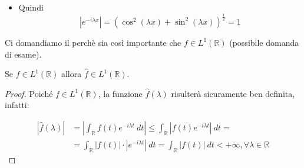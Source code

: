 \begin{itemize}
\begin{center}
          \end{center}
    \item Quindi
          $$
              |e^{-i \lambda x}| = (\cos^2 (\lambda x) + \sin^2(\lambda x))^{\frac{1}{2}} = 1
          $$

\end{itemize}

Ci domandiamo il perchè sia così importante che $f \in L^1(\mathbb{R})$ (possibile domanda di esame).\\

\begin{center}
    Se $f \in L^1(\mathbb{R})$ allora $\hat{f} \in L^1(\mathbb{R})$.
\end{center}

\begin{proof}
    Poiché $f \in L^1(\mathbb{R})$, la funzione $\hat{f}(\lambda)$ risulterà sicuramente ben definita, infatti:

    \begin{equation}
        \begin{aligned}
            |\hat{f}(\lambda)| & = \left|\int_{\mathbb{R}} f(t) e^{-i \lambda t} \ dt \right| \leq \int_{\mathbb{R}} |f(t) e^{-i \lambda t}| \ dt =                  \\
                               & = \int_{\mathbb{R}} |f(t)| \cdot |e^{-i \lambda t}| \ dt = \int_{\mathbb{R}} |f(t)| \ dt < + \infty, \forall \lambda \in \mathbb{R}
        \end{aligned}
    \end{equation}

\end{proof}

